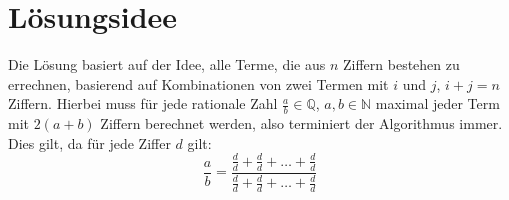 \documentclass{article}
\newcommand{\one}{\frac{d}{d}}
\begin{document}
    
\section{Lösungsidee}

Die Lösung basiert auf der Idee, alle Terme, die aus \(n\) Ziffern bestehen zu errechnen, basierend auf Kombinationen von zwei Termen mit \(i\) und \(j\), \(i+j=n\) Ziffern.
Hierbei muss für jede rationale Zahl \(\frac{a}{b}\in\mathbb{Q}\), \(a,b\in\mathbb{N}\) maximal jeder Term mit \(2(a+b)\) Ziffern berechnet werden, also terminiert der Algorithmus immer.
Dies gilt, da für jede Ziffer \(d\) gilt:
\[\frac{a}{b} = \frac{\one + \one + \ldots + \one}{\one + \one + \ldots + \one}\]
\end{document}
